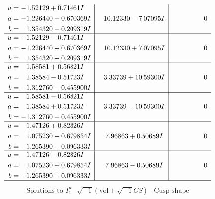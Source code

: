 \documentclass[1p]{elsarticle_modified}
\theoremstyle{definition}
\newcommand{\I}{\sqrt{-1}}
\begin{document}
$$\begin{array}{c|c|c}
\begin{aligned}
u &= -1.52129 + 0.71461 I \\
a &= -1.226440 - 0.670369 I \\
b &= \phantom{-}1.354320 - 0.209319 I\end{aligned}
 & \phantom{-}10.12330 - 7.07095 I & \phantom{-0.000000 } 0 \\ \hline\begin{aligned}
u &= -1.52129 - 0.71461 I \\
a &= -1.226440 + 0.670369 I \\
b &= \phantom{-}1.354320 + 0.209319 I\end{aligned}
 & \phantom{-}10.12330 + 7.07095 I & \phantom{-0.000000 } 0 \\ \hline\begin{aligned}
u &= \phantom{-}1.58581 + 0.56821 I \\
a &= \phantom{-}1.38584 - 0.51723 I \\
b &= -1.312760 - 0.455900 I\end{aligned}
 & \phantom{-}3.33739 + 10.59300 I & \phantom{-0.000000 } 0 \\ \hline\begin{aligned}
u &= \phantom{-}1.58581 - 0.56821 I \\
a &= \phantom{-}1.38584 + 0.51723 I \\
b &= -1.312760 + 0.455900 I\end{aligned}
 & \phantom{-}3.33739 - 10.59300 I & \phantom{-0.000000 } 0 \\ \hline\begin{aligned}
u &= \phantom{-}1.47126 + 0.82826 I \\
a &= \phantom{-}1.075230 - 0.679854 I \\
b &= -1.265390 - 0.096333 I\end{aligned}
 & \phantom{-}7.96863 + 0.50689 I & \phantom{-0.000000 } 0 \\ \hline\begin{aligned}
u &= \phantom{-}1.47126 - 0.82826 I \\
a &= \phantom{-}1.075230 + 0.679854 I \\
b &= -1.265390 + 0.096333 I\end{aligned}
 & \phantom{-}7.96863 - 0.50689 I & \phantom{-0.000000 } 0\\
 \hline 
 \end{array}$$\newpage$$\begin{array}{c|c|c}  
\text{Solutions to }I^u_{1}& \I (\text{vol} + \sqrt{-1}CS) & \text{Cusp shape}\\

\end{array}$$
\end{document}
